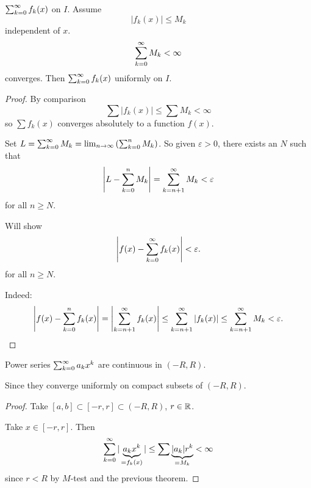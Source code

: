 \begin{theorem}\label{thm:weierstrass_M_test}
    $\infsumo f_k(x)$ on $I$.
    Assume
    \[
    |f_k(x)| \leq M_k
    \]
    independent of $x$.
    \[
    \infsumo M_k < \infty
    \]
    converges.
    Then $\infsumo f_k(x)$ uniformly on $I$.
\end{theorem}
\begin{proof}
    By comparison
    \[
    \sum|f_k(x)| \leq \sum M_k < \infty
    \]
    so $\sum f_k(x)$ converges absolutely to a function $f(x)$.

    Set $L = \infsumo M_k = \liminfty\left(\sum_{k = 0}^{n}M_k\right)$.
    So given $\varepsilon > 0$,
    there exists an $N$ such that
    \[
    \left|L - \sum_{k = 0}^{n}M_k\right| = \infsum[k = n + 1]M_k < \varepsilon
    \]
    for all $n \geq N$.

    Will show
    \[
    \left|f(x) - \infsumo f_k(x)\right| < \varepsilon.
    \]
    for all $n \geq N$.

    Indeed:
    \[
    \left|f(x) - \sum_{k = 0}^{n}f_k(x)\right| = \left|\infsum[k = n + 1]f_k(x)\right| \leq \infsum[k = n + 1]|f_k(x)| \leq \infsum[k = n + 1]M_k < \varepsilon.
    \]
\end{proof}

\begin{theorem}\label{thm:pow_series_cont_then_conv_uni}
    Power series $\infsumo a_kx ^ k$ are continuous in $(-R, R)$.

    Since they converge uniformly on compact subsets of $(-R, R)$.
\end{theorem}
\begin{proof}
    Take $[a, b] \subset [-r, r] \subset (-R, R)$,
    $r \in \R$.

    Take $x \in [-r, r]$.
    Then
    \[
    \infsumo|\underbrace{a_kx ^ k}_{= f_k(x)}| \leq \sum\underbrace{|a_k|r ^ k}_{= M_k} < \infty
    \]
    since $r < R$ by $M$-test and the previous theorem.
\end{proof}


















